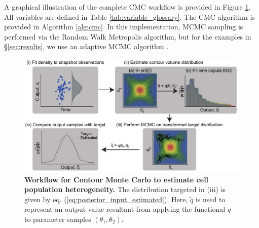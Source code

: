 A graphical illustration of the complete CMC workflow is provided in Figure \ref{fig:workflow}. All variables are defined in Table \ref{tab:variable_glossary}. The CMC algorithm is provided in Algorithm \ref{alg:cmc}. In this implementation, MCMC sampling is performed via the Random Walk Metropolis algorithm, but for the examples in \S \ref{sec:results}, we use an adaptive MCMC algorithm \cite{johnstone2016uncertainty}.

\begin{figure}[H]
  \centerline{\includegraphics[width=1.0\textwidth]{../figures/workflow.pdf}}
  \caption{\textbf{Workflow for Contour Monte Carlo to estimate cell population heterogeneity.} The distribution targeted in (iii) is given by eq. (\ref{eq:posterior_input_estimated}). Here, $\tilde q$ is used to represent an output value resultant from applying the functional $q$ to parameter samples $(\theta_1,\theta_2)$.}
  \label{fig:workflow}
\end{figure}

